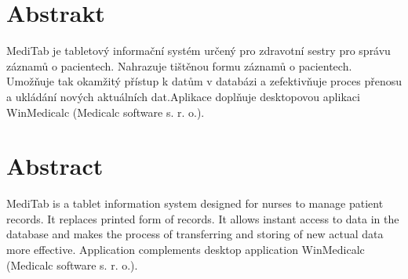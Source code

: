 


\section*{Abstrakt}
MediTab je tabletový informační systém určený pro zdravotní sestry pro správu záznamů o pacientech. Nahrazuje tištěnou formu záznamů o pacientech. Umožňuje tak okamžitý přístup k datům v databázi a zefektivňuje proces přenosu a ukládání nových aktuálních dat.Aplikace doplňuje desktopovou aplikaci WinMedicalc (Medicalc software s. r. o.).

\vfill

\section*{Abstract}
MediTab is a tablet information system designed for nurses to manage patient records. It replaces printed form of records. It allows instant access to data in the database and makes the process of transferring and storing of new actual data more effective. Application complements desktop application WinMedicalc (Medicalc software s. r. o.).

\vfill